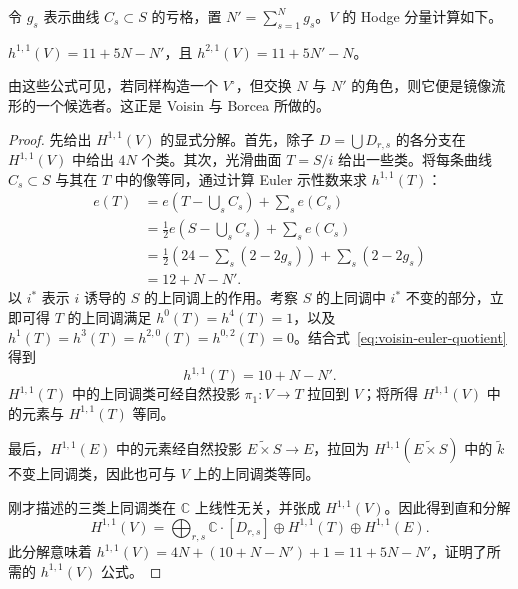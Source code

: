 令 $g_s$ 表示曲线 $C_s\subset S$ 的亏格，置 $N'=\sum_{s=1}^N g_s$。$V$ 的 Hodge 分量计算如下。
\begin{theorem}\label{thm:voisin-hodge}
$h^{1,1}(V)=11+5N-N'$，且 $h^{2,1}(V)=11+5N'-N$。
\end{theorem}
\begin{note}
由这些公式可见，若同样构造一个 $V^\circ$，但交换 $N$ 与 $N'$ 的角色，则它便是镜像流形的一个候选者。这正是 Voisin 与 Borcea 所做的。
\end{note}
\begin{proof}
先给出 $H^{1,1}(V)$ 的显式分解。首先，除子 $D=\bigcup D_{r,s}$ 的各分支在 $H^{1,1}(V)$ 中给出 $4N$ 个类。其次，光滑曲面 $T=S/i$ 给出一些类。将每条曲线 $C_s\subset S$ 与其在 $T$ 中的像等同，通过计算 Euler 示性数来求 $h^{1,1}(T)$：
\begin{equation}\label{eq:voisin-euler-quotient}
\begin{aligned}
e(T)&=e\left(T-\bigcup_s C_s\right)+\sum_s e(C_s)\\
&=\tfrac12e\left(S-\bigcup_s C_s\right)+\sum_s e(C_s)\\
&=\tfrac12\left(24-\sum_s(2-2g_s)\right)+\sum_s(2-2g_s)\\
&=12+N-N'.
\end{aligned}
\end{equation}
以 $i^*$ 表示 $i$ 诱导的 $S$ 的上同调上的作用。考察 $S$ 的上同调中 $i^*$ 不变的部分，立即可得 $T$ 的上同调满足 $h^0(T)=h^4(T)=1$，以及 $h^1(T)=h^3(T)=h^{2,0}(T)=h^{0,2}(T)=0$。结合式~\eqref{eq:voisin-euler-quotient} 得到
\begin{equation}\label{eq:voisin-quotient-h11}
h^{1,1}(T)=10+N-N'.
\end{equation}
$H^{1,1}(T)$ 中的上同调类可经自然投影 $\pi_1:V\to T$ 拉回到 $V$；将所得 $H^{1,1}(V)$ 中的元素与 $H^{1,1}(T)$ 等同。

最后，$H^{1,1}(E)$ 中的元素经自然投影 $\widetilde{E\times S}\to E$，拉回为 $H^{1,1}(\widetilde{E\times S})$ 中的 $\widetilde k$ 不变上同调类，因此也可与 $V$ 上的上同调类等同。

刚才描述的三类上同调类在 $\mathbb C$ 上线性无关，并张成 $H^{1,1}(V)$。因此得到直和分解
\begin{equation}\label{eq:voisin-h11-decomposition}
H^{1,1}(V)=\bigoplus_{r,s}\mathbb C\cdot[D_{r,s}]
\oplus H^{1,1}(T)\oplus H^{1,1}(E).
\end{equation}
此分解意味着 $h^{1,1}(V)=4N+(10+N-N')+1=11+5N-N'$，证明了所需的 $h^{1,1}(V)$ 公式。


\end{proof}
